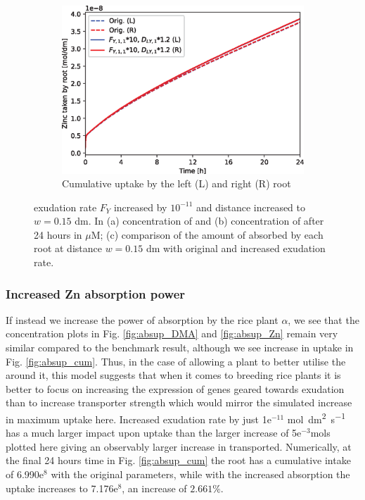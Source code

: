 \documentclass[11pt]{article}
\numberwithin{equation}{section}
\begin{document}
\begin{figure}[h]
\begin{subfigure}[t]{0.31\textwidth}
     \caption{}
     \label{fig:Fwup_Zn}
     \end{subfigure}
    \begin{subfigure}[t]{0.37\textwidth}
    \includegraphics[width=\textwidth]{Figures/testpics/ZnCumulative/IncreasedDistanceandDMAZnCumu.eps}
    \caption{Cumulative  uptake by the left (L) and right (R) root}
     \label{fig:Fwup_cum}
    \end{subfigure}
    \caption{ exudation rate $F_Y$ increased by $10^{-11}$ and distance increased to $w=0.15$ \si{dm}. In (a) concentration of  and (b) concentration of  after 24 hours in $\mu$M; (c) comparison of the amount of  absorbed by each root at distance $w=0.15$ \si{dm} with original and increased exudation rate.}
\end{figure}

 
 \subsubsection{Increased Zn absorption power}
 
If instead we increase the power of  absorption by the rice plant $\alpha$, we see that the concentration plots in Fig. \ref{fig:absup_DMA} and \ref{fig:absup_Zn} remain very similar compared to the benchmark result, although we see increase in  uptake in Fig. \ref{fig:absup_cum}. Thus, in the case of allowing a plant to better utilise the  around it, this model suggests that when it comes to breeding rice plants it is better to focus on increasing the expression of genes geared towards  exudation than to increase transporter strength which would mirror the simulated increase in maximum  uptake here. Increased  exudation rate by just 1e$^{-11}$ \si{mol.dm^2.s^{-1}}  has a much larger impact upon  uptake than the larger increase of 5e$^{-3}$mols plotted here giving an observably larger increase in  transported. Numerically, at the final 24 hours time in Fig. \ref{fig:absup_cum} the root has a cumulative intake of 6.990e$^{8}$ with the original parameters, while with the increased  absorption the uptake increases to 7.176e$^{8}$, an increase of $2.661\%$.
\end{document}
